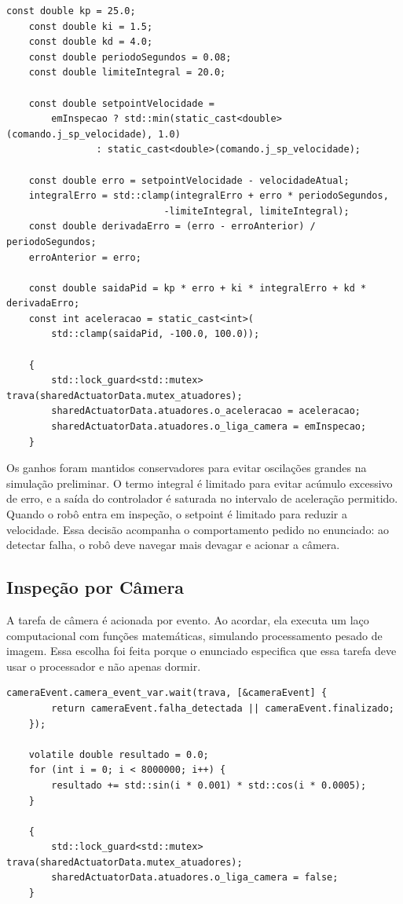 \documentclass[12pt,a4paper]{article}
\begin{document}
    \begin{lstlisting}[style=cppstyle]
    const double kp = 25.0;
    const double ki = 1.5;
    const double kd = 4.0;
    const double periodoSegundos = 0.08;
    const double limiteIntegral = 20.0;

    const double setpointVelocidade =
        emInspecao ? std::min(static_cast<double>(comando.j_sp_velocidade), 1.0)
                : static_cast<double>(comando.j_sp_velocidade);

    const double erro = setpointVelocidade - velocidadeAtual;
    integralErro = std::clamp(integralErro + erro * periodoSegundos,
                            -limiteIntegral, limiteIntegral);
    const double derivadaErro = (erro - erroAnterior) / periodoSegundos;
    erroAnterior = erro;

    const double saidaPid = kp * erro + ki * integralErro + kd * derivadaErro;
    const int aceleracao = static_cast<int>(
        std::clamp(saidaPid, -100.0, 100.0));

    {
        std::lock_guard<std::mutex> trava(sharedActuatorData.mutex_atuadores);
        sharedActuatorData.atuadores.o_aceleracao = aceleracao;
        sharedActuatorData.atuadores.o_liga_camera = emInspecao;
    }
    \end{lstlisting}

    Os ganhos foram mantidos conservadores para evitar oscilações grandes na simulação preliminar. O termo integral é limitado para evitar acúmulo excessivo de erro, e a saída do controlador é saturada no intervalo de aceleração permitido. Quando o robô entra em inspeção, o setpoint é limitado para reduzir a velocidade. Essa decisão acompanha o comportamento pedido no enunciado: ao detectar falha, o robô deve navegar mais devagar e acionar a câmera.

    \subsection{Inspeção por Câmera}

    A tarefa de câmera é acionada por evento. Ao acordar, ela executa um laço computacional com funções matemáticas, simulando processamento pesado de imagem. Essa escolha foi feita porque o enunciado especifica que essa tarefa deve usar o processador e não apenas dormir.

    \begin{lstlisting}[style=cppstyle]
    cameraEvent.camera_event_var.wait(trava, [&cameraEvent] {
        return cameraEvent.falha_detectada || cameraEvent.finalizado;
    });

    volatile double resultado = 0.0;
    for (int i = 0; i < 8000000; i++) {
        resultado += std::sin(i * 0.001) * std::cos(i * 0.0005);
    }

    {
        std::lock_guard<std::mutex> trava(sharedActuatorData.mutex_atuadores);
        sharedActuatorData.atuadores.o_liga_camera = false;
    }
    \end{lstlisting}
\end{document}
